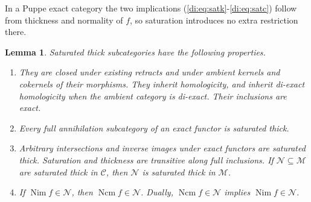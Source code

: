 \documentclass[11pt,reqno,a4paper]{amsart}
\newtheorem{lemma}[theorem]{Lemma}
\theoremstyle{definition}
\theoremstyle{remark}
\newcommand{\C}{\mathcal{C}}
\newcommand{\M}{\mathcal{M}}
\newcommand{\N}{\mathcal{N}}
\newcommand{\0}{\mathbf{0}}
\renewcommand{\1}{\mathbf{1}}
\newcommand{\Nim}{\operatorname{Nim}}
\newcommand{\Ncm}{\operatorname{Ncm}}
\begin{document}
In a Puppe exact category the two implications (\ref{di:eq:satk}-\ref{di:eq:satc}) follow from thickness and normality of $f$, so saturation introduces no extra restriction there.

\begin{lemma}\label{di:lem:saturated-properties}
Saturated thick subcategories have the following properties.
\begin{enumerate}[label=\textup{(\roman*)}]
\item They are closed under existing retracts and under ambient kernels and cokernels of their morphisms. They inherit homologicity, and inherit di-exact homologicity when the ambient category is di-exact. Their inclusions are exact.
\item Every full annihilation subcategory of an exact functor is saturated thick.
\item Arbitrary intersections and inverse images under exact functors are saturated thick. Saturation and thickness are transitive along full inclusions. If $\N\subseteq\M$ are saturated thick in $\C$, then $\N$ is saturated thick in $\M$.
\item If $\Nim f\in\N$, then $\Ncm f\in\N$. Dually, $\Ncm f\in\N$ implies $\Nim f\in\N$.
\end{enumerate}
\end{lemma}
\end{document}
